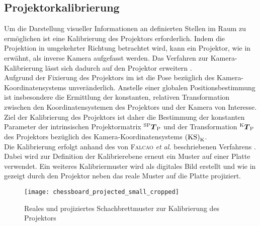 \prever{
}

\subsection{Projektorkalibrierung}
\label{chap.projcalib}
Um die Darstellung visueller Informationen an definierten Stellen im Raum zu ermöglichen ist eine Kalibrierung des Projektors erforderlich. Indem die Projektion in umgekehrter Richtung betrachtet wird, kann ein Projektor, wie in  erwähnt, als inverse Kamera aufgefasst werden. Das Verfahren zur Kamera-Kalibrierung lässt sich dadurch auf den Projektor erweitern \cite{Falcao2008}.\\

Aufgrund der Fixierung des Projektors im \kps{} ist die Pose bezüglich des Kamera-Koordinatensystems unveränderlich. Anstelle einer globalen Positionsbestimmung ist insbesondere die Ermittlung der konstanten, relativen Transformation zwischen den Koordinatensystemen des Projektors und der Kamera von Interesse. Ziel der Kalibrierung des Projektors ist daher die Bestimmung der konstanten Parameter der intrinsischen Projektormatrix ${^{\mathrm{SP}}\mbox{\boldmath{$T$}}_{\mathrm{P}}}$ und der Transformation ${^{\mathrm{K}}\mbox{\boldmath{$T$}}_{\mathrm{P}}}$ des Projektors bezüglich des Kamera-Koordinatensystems ${\mathrm{(KS)}}_{\mathrm{K}}$.\\

Die Kalibrierung erfolgt anhand des von \textsc{Falcao} \textit{et al.} beschriebenen Verfahrens \cite{Falcao2008}. Dabei wird zur Definition der Kalibrierebene erneut ein Muster auf einer Platte verwendet. Ein weiteres Kalibriermuster wird als digitales Bild erstellt und wie in  gezeigt durch den Projektor neben das reale Muster auf die Platte projiziert.

\begin{figure}[ht]
	\begin{center}
		\texttt{[image: chessboard\_projected\_small\_cropped]}
		\caption{Reales und projiziertes Schachbrettmuster zur Kalibrierung des Projektors}
		\label{fig.projcalib}
	\end{center}
\end{figure}

